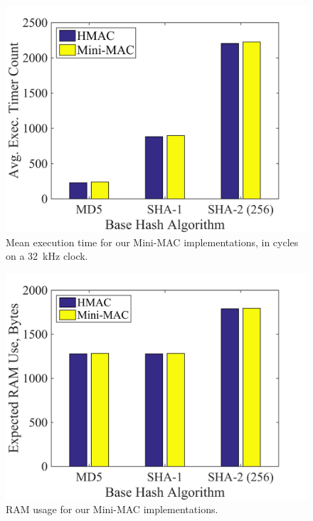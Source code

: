 	\begin{figure}
		\centering
		\includegraphics[width=\columnwidth]{figures/exec_cycles.png}
		\caption{Mean execution time for our Mini-MAC implementations, in cycles on a 32~kHz clock.}
		\label{fig-execution}
	\end{figure}
	
	\begin{figure}
		\centering
		\includegraphics[width=\columnwidth]{figures/ram_usage.png}
		\caption{RAM usage for our Mini-MAC implementations.}
		\label{fig-ram}
	\end{figure}
	
